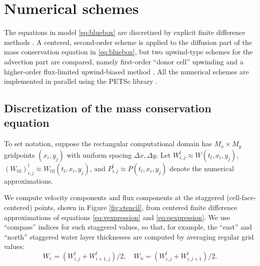 \documentclass[gmd]{copernicus}   %
\begin{document}
\section{Numerical schemes}  \label{sec:num}

The equations in model \eqref{eq:bluebox} are discretized by explicit finite difference methods \citep{MortonMayers}.   A centered, second-order scheme is applied to the diffusion part of the mass conservation equation in \eqref{eq:bluebox}, but two upwind-type schemes for the advection part are compared, namely first-order ``donor cell'' upwinding \citep{LeVeque} and a higher-order flux-limited upwind-biased method \citep{HundsdorferVerwer2010}.  All the numerical schemes are implemented in parallel using the PETSc library \citep{petsc-user-ref}.

\subsection{Discretization of the mass conservation equation}  \label{subsec:Wfd}  To set notation, suppose the rectangular computational domain has $M_x \times M_y$ gridpoints $(x_i,y_j)$ with uniform spacing $\Delta x,\Delta y$.  Let $W^l_{i,j} \approx W(t_l,x_i,y_j)$, $(W_{\text{til}})_{i,j}^l \approx W_{\text{til}}(t_l,x_i,y_j)$, and $P_{i,j}^l \approx P(t_l,x_i,y_j)$ denote the numerical approximations.

We compute velocity components and flux components at the staggered (cell-face-centered) points, shown in Figure \ref{fig:stencil}, from centered finite difference approximations of equations \eqref{eq:vexpression} and \eqref{eq:qexpression}.  We use ``compass'' indices for such staggered values, so that, for example, the ``east'' and ``north'' staggered water layer thicknesses are computed by averaging regular grid values:
\begin{equation}
W_e = (W_{i,j}^l + W_{i+1,j}^l)/2, \quad W_n = (W_{i,j}^l + W_{i,j+1}^l)/2. \label{eq:stagW}
\end{equation}
\end{document}

